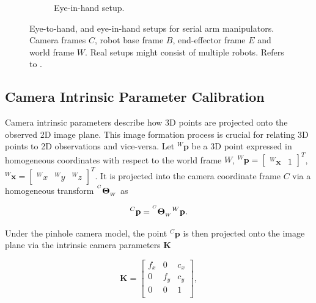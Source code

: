 \begin{figure}[tb]
\begin{subfigure}[b]{0.49\textwidth}
        \caption{Eye-in-hand setup.}
        \label{in:fig:eye_in_hand}
    \end{subfigure}
    \caption{Eye-to-hand, and eye-in-hand setups for serial arm manipulators. Camera frames $C$, robot base frame $B$, end-effector frame $E$ and world frame $W$. Real setups might consist of multiple robots. Refers to .}
    \label{in:fig:coordinate_frames}
\end{figure}

\subsection{Camera Intrinsic Parameter Calibration}
\label{in:sec:camera_intrinsic_calibration}
Camera intrinsic parameters describe how 3D points are projected onto the observed 2D image plane. This image formation process is crucial for relating 3D points to 2D observations and vice-versa. Let ${}^W\mathbf{p}$ be a 3D point expressed in homogeneous coordinates with respect to the world frame $W$, ${}^W\mathbf{p} = \begin{bmatrix}
    {}^W\mathbf{x} & 1
\end{bmatrix}^T$, ${}^W\mathbf{x} = \begin{bmatrix}
    {}^Wx & {}^Wy & {}^Wz
\end{bmatrix}^T$. It is projected into the camera coordinate frame $C$ via a homogeneous transform ${}^{^C}\mathbf{\Theta}_{_W}$ as

\begin{equation}
    {}^C\mathbf{p} = {}^{^C}\mathbf{\Theta}_{_W} {}^W\mathbf{p}.
\end{equation}

Under the pinhole camera model, the point ${}^C\mathbf{p}$ is then projected onto the image plane via the intrinsic camera parameters $\mathbf{K}$

\begin{equation}
    \mathbf{K} = \begin{bmatrix}
        f_x & 0 & c_x \\
        0 & f_y & c_y \\
        0 & 0 & 1 \\
    \end{bmatrix},
\end{equation}

